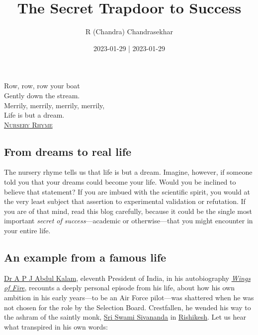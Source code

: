 \documentclass[
  a4paper,
]{article}
\title{The Secret Trapdoor to Success}
\author{R (Chandra) Chandrasekhar}
\date{2023-01-29 | 2023-01-29}
\begin{document}
\maketitle

\thispagestyle{empty}


\begin{flushright}

\begin{footnotesize}

Row, row, row your boat\\
Gently down the stream.\\
Merrily, merrily, merrily, merrily,\\
Life is but a dream.\\
\href{https://en.wikipedia.org/wiki/Row,_Row,_Row_Your_Boat}{\textsc{Nursery
Rhyme}}

\end{footnotesize}

\end{flushright}

\hypertarget{from-dreams-to-real-life}{%
\subsection{From dreams to real life}\label{from-dreams-to-real-life}}

The nursery rhyme tells us that life is but a dream. Imagine, however,
if someone told you that your dreams could become your life. Would you
be inclined to believe that statement? If you are imbued with the
scientific spirit, you would at the very least subject that assertion to
experimental validation or refutation. If you are of that mind, read
this blog carefully, because it could be the single most important
\emph{secret of success}---academic or otherwise---that you might
encounter in your entire life.

\hypertarget{an-example-from-a-famous-life}{%
\subsection{An example from a famous
life}\label{an-example-from-a-famous-life}}

\href{https://en.wikipedia.org/wiki/A._P._J._Abdul_Kalam}{Dr A P J Abdul
Kalam}, eleventh President of India, in his autobiography
\href{https://en.wikipedia.org/wiki/Wings_of_Fire_(autobiography)}{\emph{Wings
of Fire}}, recounts a deeply personal episode from his life, about how
his own ambition in his early years---to be an Air Force pilot---was
shattered when he was not chosen for the role by the Selection Board.
Crestfallen, he wended his way to the ashram of the saintly monk,
\href{https://en.wikipedia.org/wiki/Sivananda_Saraswati}{Sri Swami
Sivananda} in \href{https://en.wikipedia.org/wiki/Rishikesh}{Rishikesh}.
Let us hear what transpired in his own words:
\end{document}
